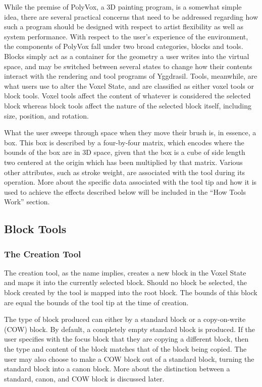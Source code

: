 \documentclass[onecolumn, draftclsnofoot,10pt, compsoc]{IEEEtran}
\begin{document}
While the premise of PolyVox, a 3D painting program, is a somewhat simple idea, there are several practical concerns that need to be addressed regarding how such a program should be designed with respect to artist flexibility as well as system performance. With respect to the user’s experience of the environment, the components of PolyVox fall under two broad categories, blocks and tools. Blocks simply act as a container for the geometry a user writes into the virtual space, and may be switched between several states to change how their contents interact with the rendering and tool programs of Yggdrasil. Tools, meanwhile, are what users use to alter the Voxel State, and are classified as either voxel tools or block tools. Voxel tools affect the content of whatever is considered the selected block whereas block tools affect the nature of the selected block itself, including size, position, and rotation.

What the user sweeps through space when they move their brush is, in essence, a box. This box is described by a four-by-four matrix, which encodes where the bounds of the box are in 3D space, given that the box is a cube of side length two centered at the origin which has been multiplied by that matrix. Various other attributes, such as stroke weight, are associated with the tool during its operation. More about the specific data associated with the tool tip and how it is used to achieve the effects described below will be included in the “How Tools Work” section.

\subsection{Block Tools}

\subsubsection{The Creation Tool}

The creation tool, as the name implies, creates a new block in the Voxel State and maps it into the currently selected block. Should no block be selected, the block created by the tool is mapped into the root block. The bounds of this block are equal the bounds of the tool tip at the time of creation.

The type of block produced can either by a standard block or a copy-on-write (COW) block. By default, a completely empty standard block is produced. If the user specifies with the focus block that they are copying a different block, then the type and content of the block matches that of the block being copied. The user may also choose to make a COW block out of a standard block, turning the standard block into a canon block. More about the distinction between a standard, canon, and COW block is discussed later.
\end{document}
